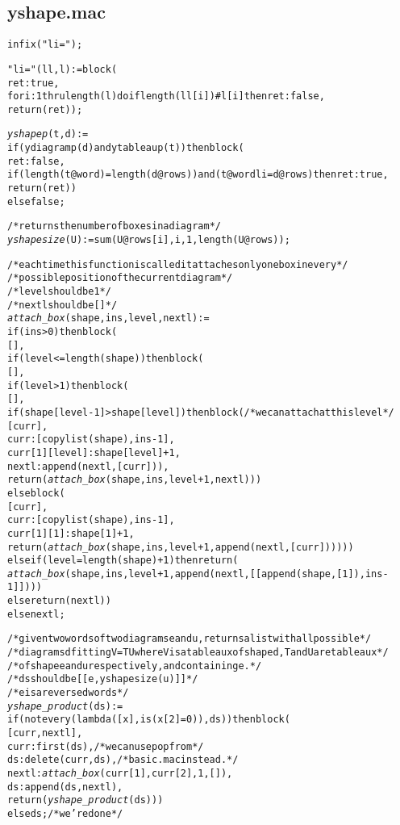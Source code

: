 \subsection*{yshape.mac}
\begin{alltt}
\footnotesize
infix ("li=");

"li=" (ll,l) := block (
  ret : true,
  for i : 1 thru length (l) do if length (ll[i]) # l[i] then ret : false,
  return (ret));

\emph{yshapep} (t,d) :=
if (ydiagramp (d) and ytableaup (t)) then block (
  ret : false,
  if (length (t@word) = length (d@rows)) and (t@word li= d@rows) then ret : true,
  return (ret))
else false;

/* returns the number of boxes in a diagram */
\emph{yshapesize} (U) := sum (U@rows[i], i, 1, length (U@rows));

/* each time this function is called it attaches only one box in every */
/* possible position of the current diagram */
/* level should be 1 */
/* nextl should be [] */
\emph{attach\_box} (shape, ins, level, nextl) :=
if (ins > 0) then block (
  [],
  if (level <= length (shape)) then block (
    [],
    if (level > 1) then block (
      [],
      if (shape[level - 1] > shape[level]) then block ( /* we can attach at this level */
        [curr],
        curr : [copylist (shape), ins - 1],
        curr[1][level] : shape[level] + 1,
        nextl : append (nextl, [curr])),
      return (\emph{attach\_box} (shape, ins, level + 1, nextl)))
    else block (
      [curr],
      curr : [copylist (shape), ins - 1],
      curr[1][1] : shape[1] + 1,
      return (\emph{attach\_box} (shape, ins, level + 1, append (nextl, [curr])))))
  else if (level = length (shape) + 1) then return (
    \emph{attach\_box} (shape, ins, level + 1, append (nextl, [[append (shape, [1]), ins - 1]])))
  else return (nextl))
else nextl;

/* given two words of two diagrams e and u, returns a list with all possible */
/* diagrams d fitting V=TU where V is a tableaux of shape d, T and U are tableaux */
/* of shape e and u respectively, and containing e. */
/* ds should be [[e,yshapesize(u)]] */
/* e is a reversed words */
\emph{yshape\_product} (ds) :=
if (not every (lambda ([x], is (x[2] = 0)), ds)) then block (
  [curr,nextl],
  curr : first (ds),      /* we can use pop from */
  ds : delete (curr, ds), /* basic.mac instead. */
  nextl : \emph{attach\_box} (curr[1], curr[2], 1, []),
  ds : append (ds, nextl),
  return (\emph{yshape\_product} (ds)))
else ds; /* we're done */
\end{alltt}
\small

